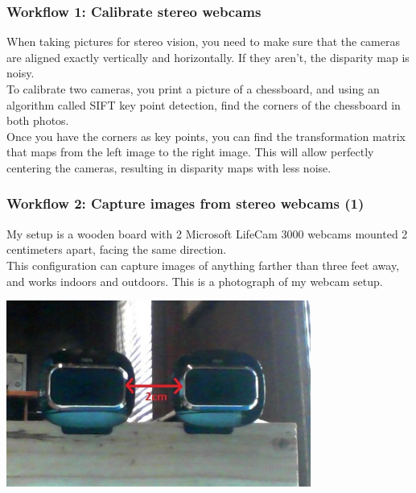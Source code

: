 \documentclass[19pt]{beamer}
\begin{document}
\begin{frame}
\frametitle{Workflow 1: Calibrate stereo webcams}

When taking pictures for stereo vision, you need to make sure that the cameras are aligned exactly vertically and horizontally. If they aren't, the disparity map is noisy.\\[10pt]
%
To calibrate two cameras, you print a picture of a chessboard, and using an algorithm called SIFT key point detection, find the corners of the chessboard in both photos.\\[10pt]
%
Once you have the corners as key points, you can find the transformation matrix that maps from the left image to the right image. This will allow perfectly centering the cameras, resulting in  disparity maps with less noise.
\end{frame}


\begin{frame}
\frametitle{Workflow 2: Capture images from stereo webcams (1)}

My setup is a wooden board with 2 Microsoft LifeCam 3000 webcams mounted 2 centimeters apart, facing the same direction. \\[10pt]
%
This configuration can capture images of anything farther than three feet away, and works indoors and outdoors. This is a photograph of my webcam setup.\\

\begin{center}
\includegraphics[width=0.75\textwidth, trim=30 50 45 50, clip]{images/setup.jpg}
\end{center}

\end{frame}
\end{document}
